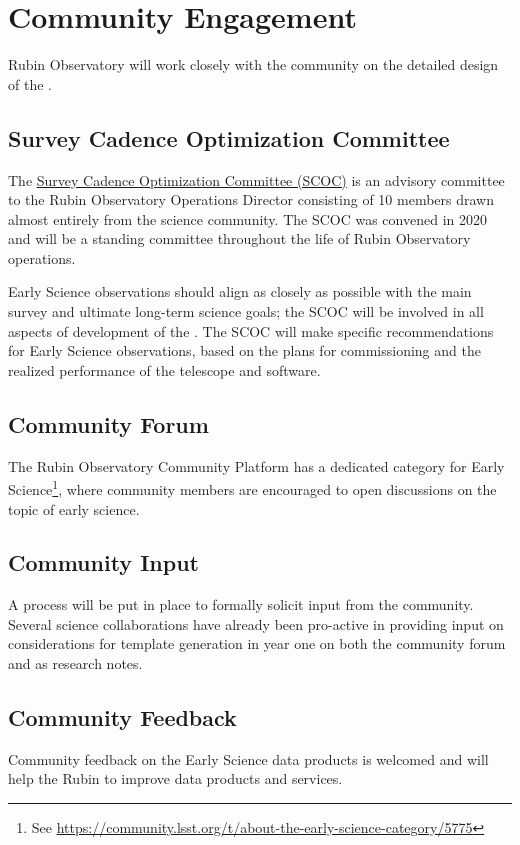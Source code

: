 \section{Community Engagement}

Rubin Observatory will work closely with the community on the detailed design of the \esp. 

\subsection{Survey Cadence Optimization Committee}
The \href{https://www.lsst.org/content/charge-survey-cadence-optimization-committee-scoc}{Survey Cadence Optimization Committee (SCOC)} is an advisory committee to the Rubin Observatory Operations Director consisting of 10 members drawn almost entirely from the science community.
The SCOC was convened in 2020 and will be a standing committee throughout the life of Rubin Observatory operations. 

Early Science observations should align as closely as possible with the main survey and ultimate long-term science goals; the SCOC will be involved in all aspects of development of the \esp. 
The SCOC will make specific recommendations for Early Science observations, based on the plans for commissioning and the realized performance of the telescope and software. 


\subsection{Community Forum}

The Rubin Observatory Community Platform has a dedicated category for Early Science\footnote{ See \url{https://community.lsst.org/t/about-the-early-science-category/5775}}, where community members are encouraged to open discussions on the topic of early science. 

\subsection{Community Input}

A process will be put in place to formally solicit input from the community. 
Several science collaborations have already been pro-active in providing input on considerations for template generation in year one on both the community forum and as research notes.


\subsection{Community Feedback}

Community feedback on the Early Science data products is welcomed and will help the Rubin to improve data products and services. 
